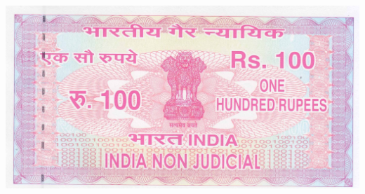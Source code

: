 \documentclass[legalpaper,12pt]{article}
\begin{document}

\includegraphics[width=\columnwidth]{../../stamp_currency/100.jpeg} %
\end{document}
